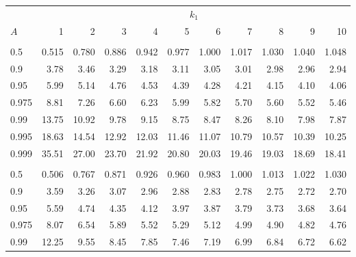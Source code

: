 \documentclass[]{article}
\begin{document}
\begin{table}[H]
\centering
\begin{tabular}{lrrrrrrrrrr}
\toprule
\multicolumn{1}{c}{ } & \multicolumn{10}{c}{$k_1$} \\
\cmidrule(l{3pt}r{3pt}){2-11}
\hspace{1.1em}$A$ & 1 & 2 & 3 & 4 & 5 & 6 & 7 & 8 & 9 & 10\\
\midrule
\addlinespace[0.3em]
\multicolumn{11}{l}{\textbf{$k_2=6$}}\\
\hspace{1em}0.5 & 0.515 & 0.780 & 0.886 & 0.942 & 0.977 & 1.000 & 1.017 & 1.030 & 1.040 & 1.048\\
\hspace{1em}0.9 & 3.78 & 3.46 & 3.29 & 3.18 & 3.11 & 3.05 & 3.01 & 2.98 & 2.96 & 2.94\\
\hspace{1em}0.95 & 5.99 & 5.14 & 4.76 & 4.53 & 4.39 & 4.28 & 4.21 & 4.15 & 4.10 & 4.06\\
\hspace{1em}0.975 & 8.81 & 7.26 & 6.60 & 6.23 & 5.99 & 5.82 & 5.70 & 5.60 & 5.52 & 5.46\\
\hspace{1em}0.99 & 13.75 & 10.92 & 9.78 & 9.15 & 8.75 & 8.47 & 8.26 & 8.10 & 7.98 & 7.87\\
\hspace{1em}0.995 & 18.63 & 14.54 & 12.92 & 12.03 & 11.46 & 11.07 & 10.79 & 10.57 & 10.39 & 10.25\\
\hspace{1em}0.999 & 35.51 & 27.00 & 23.70 & 21.92 & 20.80 & 20.03 & 19.46 & 19.03 & 18.69 & 18.41\\
\addlinespace[0.3em]
\multicolumn{11}{l}{\textbf{$k_2=7$}}\\
\hspace{1em}0.5 & 0.506 & 0.767 & 0.871 & 0.926 & 0.960 & 0.983 & 1.000 & 1.013 & 1.022 & 1.030\\
\hspace{1em}0.9 & 3.59 & 3.26 & 3.07 & 2.96 & 2.88 & 2.83 & 2.78 & 2.75 & 2.72 & 2.70\\
\hspace{1em}0.95 & 5.59 & 4.74 & 4.35 & 4.12 & 3.97 & 3.87 & 3.79 & 3.73 & 3.68 & 3.64\\
\hspace{1em}0.975 & 8.07 & 6.54 & 5.89 & 5.52 & 5.29 & 5.12 & 4.99 & 4.90 & 4.82 & 4.76\\
\hspace{1em}0.99 & 12.25 & 9.55 & 8.45 & 7.85 & 7.46 & 7.19 & 6.99 & 6.84 & 6.72 & 6.62\\

\end{tabular}
\end{table}
\end{document}
